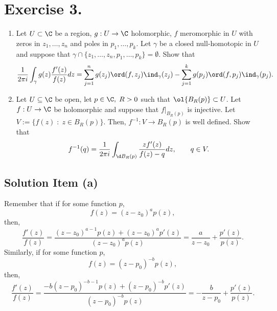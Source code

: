 \section*{Exercise 3.}

\begin{enumerate}[label=(\alph*)]
    \item Let $U \subset \C$ be a region, $g:U \to \C$ holomorphic, $f$ meromorphic in $U$ with zeros in $z_1,\ldots, z_n$ and poles in $p_1,\ldots, p_k$. Let $\gamma$ be a closed null-homotopic in $U$ and suppose that $\gamma \cap \{z_1,\ldots,z_n,p_1,\ldots,p_k\} = \emptyset$. Show that
    \[ \frac{1}{2\pi i}\int_\gamma g(z) \frac{f'(z)}{f(z)} dz = \sum_{j = 1}^{n}g(z_j) \ord(f,z_j) \ind_\gamma(z_j) - \sum_{j = 1}^{k} g(p_j)\ord(f,p_j)\ind_{\gamma}(p_j).\]

    \item Let $U\subseteq \C$ be open, let $p\in \C,\; R> 0$ such that $\ol{B_R(p)} \subset U$. Let $f : U\to \C$ be holomorphic and suppose that $f |_{B_R(p)}$ is injective. Let $V := \{ f(z) \;:\; z \in  B_R(p)\}$. Then, $f^{-1}: V \to B_R(p)$ is well defined. Show that 
    \[ f^{-1}(q) = \frac{1}{2\pi i}\int_{\d B_R(p)} \frac{z f'(z)}{f(z) - q} dz,\hspace{2em} q \in V. \]
\end{enumerate}

\subsection*{Solution Item (a)}

Remember that if for some function $p$,
\[ f(z) = (z-z_0)^a p(z), \]
then,
\[ \frac{f'(z)}{f(z)} = \frac{(z-z_0)^{a-1} p(z) + (z-z_0)^a p'(z)}{(z-z_0)^a p(z)} = \frac{a}{z-z_0} + \frac{p'(z)}{p(z)}. \]
Similarly, if for some function $p$,
\[ f(z) = (z-p_0)^{-b} p(z), \]
then,
\[ \frac{f'(z)}{f(z)} = \frac{-b(z-p_0)^{-b-1} p(z) + (z-p_0)^{-b}p'(z)}{(z-p_0)^{-b}p(z)} = -\frac{b}{z-p_0} + \frac{p'(z)}{p(z)}. \]

